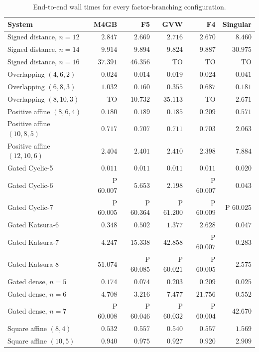 \begin{table}[pos=htbp]
\centering
\caption{End-to-end wall times for every factor-branching configuration.}
\label{tab:appendix-branching}
\small
\setlength{\tabcolsep}{4pt}
\begin{tabular}{l r r r r r}
\hline
System & M4GB & F5 & GVW & F4 & Singular \\
\hline
Signed distance, $n=12$ & $2.847$ & $2.669$ & $2.716$ & $2.670$ & $8.460$ \\
Signed distance, $n=14$ & $9.914$ & $9.894$ & $9.824$ & $9.887$ & $30.975$ \\
Signed distance, $n=16$ & $37.391$ & $46.356$ & TO & TO & TO \\
Overlapping $(4,6,2)$ & $0.024$ & $0.014$ & $0.019$ & $0.024$ & $0.041$ \\
Overlapping $(6,8,3)$ & $1.032$ & $0.160$ & $0.355$ & $0.687$ & $0.181$ \\
Overlapping $(8,10,3)$ & TO & $10.732$ & $35.113$ & TO & $2.671$ \\
Positive affine $(8,6,4)$ & $0.180$ & $0.189$ & $0.185$ & $0.209$ & $0.571$ \\
Positive affine $(10,8,5)$ & $0.717$ & $0.707$ & $0.711$ & $0.703$ & $2.063$ \\
Positive affine $(12,10,6)$ & $2.404$ & $2.401$ & $2.410$ & $2.398$ & $7.884$ \\
Gated Cyclic-5 & $0.011$ & $0.011$ & $0.011$ & $0.011$ & $0.020$ \\
Gated Cyclic-6 & P $60.007$ & $5.653$ & $2.198$ & P $60.007$ & $0.043$ \\
Gated Cyclic-7 & P $60.005$ & P $60.364$ & P $61.200$ & P $60.009$ & P $60.025$ \\
Gated Katsura-6 & $0.348$ & $0.502$ & $1.377$ & $2.628$ & $0.047$ \\
Gated Katsura-7 & $4.247$ & $15.338$ & $42.858$ & P $60.007$ & $0.283$ \\
Gated Katsura-8 & $51.074$ & P $60.085$ & P $60.021$ & P $60.005$ & $2.575$ \\
Gated dense, $n=5$ & $0.174$ & $0.074$ & $0.203$ & $0.209$ & $0.025$ \\
Gated dense, $n=6$ & $4.708$ & $3.216$ & $7.477$ & $21.756$ & $0.552$ \\
Gated dense, $n=7$ & P $60.008$ & P $60.046$ & P $60.032$ & P $60.004$ & $42.670$ \\
Square affine $(8,4)$ & $0.532$ & $0.557$ & $0.540$ & $0.557$ & $1.569$ \\
Square affine $(10,5)$ & $0.940$ & $0.975$ & $0.927$ & $0.920$ & $2.909$ \\
\hline
\end{tabular}
\end{table}
\FloatBarrier

